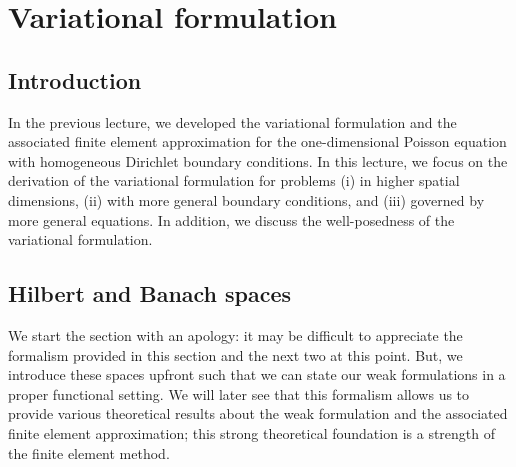 \chapter{Variational formulation}

\disclaimer

\section{Introduction}
In the previous lecture, we developed the variational formulation and the associated finite element approximation for the one-dimensional Poisson equation with homogeneous Dirichlet boundary conditions. In this lecture, we focus on the derivation of the variational formulation for problems (i) in higher spatial dimensions, (ii) with more general boundary conditions, and (iii) governed by more general equations.  In addition, we discuss the well-posedness of the variational formulation.

\section{Hilbert and Banach spaces}
We start the section with an apology: it may be difficult to appreciate the formalism provided in this section and the next two at this point.  But, we introduce these spaces upfront such that we can state our weak formulations in a proper functional setting.  We will later see that this formalism allows us to provide various theoretical results about the weak formulation and the associated finite element approximation; this strong theoretical foundation is a strength of the finite element method. 

